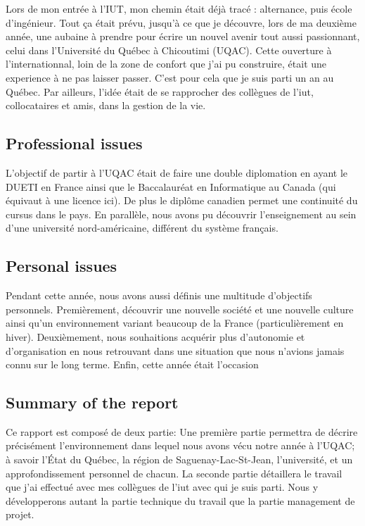 Lors de mon entrée à l'IUT, mon chemin était déjà tracé : alternance, puis école d'ingénieur. Tout ça était prévu, jusqu'à ce que je découvre, lors de ma deuxième année, une aubaine à prendre pour écrire un nouvel avenir tout aussi passionnant, celui dans l'Université du Québec à Chicoutimi (UQAC). Cette ouverture à l'internationnal, loin de la zone de confort que j'ai pu construire, était une experience à ne pas laisser passer. C'est pour cela que je suis parti un an au Québec.
Par ailleurs, l'idée était de se rapprocher des collègues de l'iut, collocataires et amis, dans la gestion de la vie.

\subsection{Professional issues}

L'objectif de partir à l'UQAC était de faire une double diplomation en ayant le DUETI en France ainsi que le Baccalauréat en Informatique au Canada (qui équivaut à une licence ici). De plus le diplôme canadien permet une continuité du cursus dans le pays. En parallèle, nous avons pu découvrir l'enseignement au sein d'une université nord-américaine, différent du système français.

\subsection{Personal issues}

Pendant cette année, nous avons aussi définis une multitude d'objectifs personnels.
Premièrement, découvrir une nouvelle société et une nouvelle culture ainsi qu'un environnement variant beaucoup de la France (particulièrement en hiver). 
Deuxièmement, nous souhaitions acquérir plus d'autonomie et d'organisation en nous retrouvant dans une situation que nous n'avions jamais connu sur le long terme.
Enfin, cette année était l'occasion

\subsection{Summary of the report}

Ce rapport est composé de deux partie:\newline
Une première partie permettra de décrire précisément l’environnement dans lequel nous avons vécu notre année à l’UQAC; à savoir l’État du Québec, la région de Saguenay-Lac-St-Jean, l’université, et un approfondissement personnel de chacun.\newline
La seconde partie détaillera le travail que j’ai effectué avec mes collègues de l'iut avec qui je suis parti. Nous y
développerons autant la partie technique du travail que la partie management de projet.

